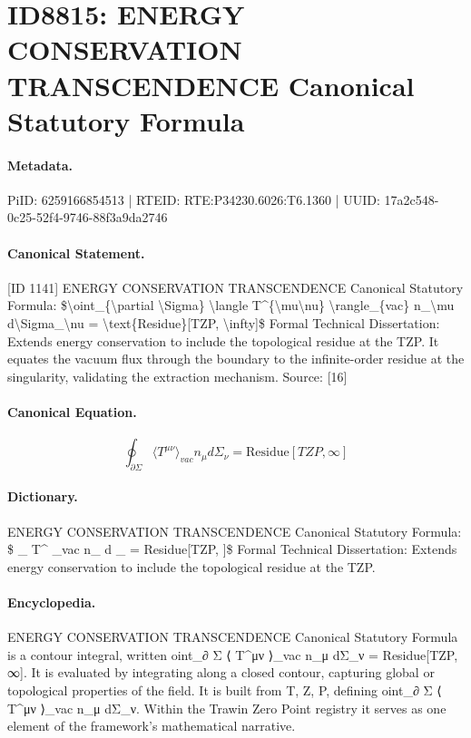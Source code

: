 \section*{ID8815: ENERGY CONSERVATION TRANSCENDENCE Canonical Statutory Formula}
\paragraph{Metadata.}
PiID: 6259166854513 | RTEID: RTE:P34230.6026:T6.1360 | UUID: 17a2c548-0c25-52f4-9746-88f3a9da2746

\paragraph{Canonical Statement.}
[ID 1141] ENERGY CONSERVATION TRANSCENDENCE Canonical Statutory Formula: \$\textbackslash{}oint\_\{\textbackslash{}partial \textbackslash{}Sigma\} \textbackslash{}langle T\textasciicircum{}\{\textbackslash{}mu\textbackslash{}nu\} \textbackslash{}rangle\_\{vac\} n\_\textbackslash{}mu d\textbackslash{}Sigma\_\textbackslash{}nu = \textbackslash{}text\{Residue\}[TZP, \textbackslash{}infty]\$ Formal Technical Dissertation: Extends energy conservation to include the topological residue at the TZP. It equates the vacuum flux through the boundary to the infinite-order residue at the singularity, validating the extraction mechanism. Source: [16]

\paragraph{Canonical Equation.}
\[
\oint_{\partial \Sigma} \langle T^{\mu\nu} \rangle_{vac} n_\mu d\Sigma_\nu = \text{Residue}[TZP, \infty]
\]

\paragraph{Dictionary.}
ENERGY CONSERVATION TRANSCENDENCE Canonical Statutory Formula: \$ \_ T\textasciicircum{} \_vac n\_ d \_ = Residue[TZP, ]\$ Formal Technical Dissertation: Extends energy conservation to include the topological residue at the TZP.

\paragraph{Encyclopedia.}
ENERGY CONSERVATION TRANSCENDENCE Canonical Statutory Formula is a contour integral, written oint\_∂ Σ ⟨ T\textasciicircum{}μν ⟩\_vac n\_μ dΣ\_ν = Residue[TZP, ∞]. It is evaluated by integrating along a closed contour, capturing global or topological properties of the field. It is built from T, Z, P, defining oint\_∂ Σ ⟨ T\textasciicircum{}μν ⟩\_vac n\_μ dΣ\_ν. Within the Trawin Zero Point registry it serves as one element of the framework's mathematical narrative.

